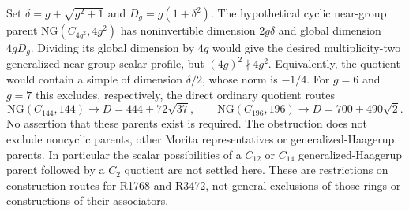 Set $\delta=g+\sqrt{g^2+1}$ and $D_g=g(1+\delta^2)$.
The hypothetical cyclic near-group parent $\mathrm{NG}(C_{4g^2},4g^2)$
has noninvertible dimension $2g\delta$ and global dimension $4gD_g$.
Dividing its global dimension by $4g$ would give the desired
multiplicity-two generalized-near-group scalar profile, but
$(4g)^2\nmid4g^2$. Equivalently, the quotient would contain a simple
of dimension $\delta/2$, whose norm is $-1/4$.
For $g=6$ and $g=7$ this excludes, respectively, the direct ordinary
quotient routes
\[
 \mathrm{NG}(C_{144},144)\longrightarrow D=444+72\sqrt{37},
 \qquad
 \mathrm{NG}(C_{196},196)\longrightarrow D=700+490\sqrt2.
\]
No assertion that these parents exist is required. The obstruction
does not exclude noncyclic parents, other Morita representatives or
generalized-Haagerup parents. In particular the scalar possibilities
of a $C_{12}$ or $C_{14}$ generalized-Haagerup parent followed by a
$C_2$ quotient are not settled here. These are restrictions on
construction routes for R1768 and R3472, not general exclusions of
those rings or constructions of their associators.

